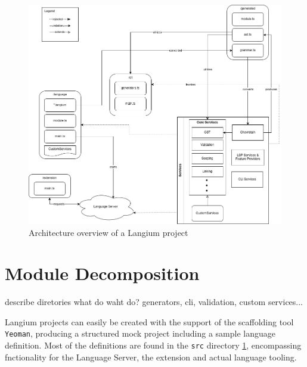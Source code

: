 \begin{figure}[ht]
  \centering
  \includegraphics[width=\textwidth]{graphics/langiumArchitecture.png}
  \caption{Architecture overview of a Langium project}
  \label{fig:langium-architecture}
\end{figure}


\section{Module Decomposition}
describe diretories
what do waht do? generators, cli, validation, custom services...

Langium projects can easily be created with the support of the scaffolding tool \verb|Yeoman|, producing a structured mock project including a sample language definition.
Most of the definitions are found in the \verb|src| directory \ref{fig:langium-architecture}, encompassing fnctionality for the Language Server, the extension and actual language tooling.

